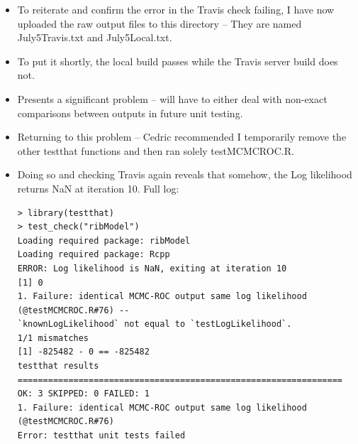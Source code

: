 \documentclass[12pt,hyperref]{labbook}
\begin{document}
\begin{itemize}
    \item To reiterate and confirm the error in the Travis check failing, I have now uploaded the raw output files to this directory -- They are named July5Travis.txt and July5Local.txt.
    \item To put it shortly, the local build passes while the Travis server build does not.
    \item Presents a significant problem -- will have to either deal with non-exact comparisons between outputs in future unit testing.
    \item Returning to this problem -- Cedric recommended I temporarily remove the other testthat functions and then ran solely testMCMCROC.R.
    \item Doing so and checking Travis again reveals that somehow, the Log likelihood returns NaN at iteration 10. Full log:

\noindent\begin{minipage}{\linewidth}
\begin{lstlisting}
> library(testthat)
> test_check("ribModel")
Loading required package: ribModel
Loading required package: Rcpp
ERROR: Log likelihood is NaN, exiting at iteration 10
[1] 0
1. Failure: identical MCMC-ROC output same log likelihood (@testMCMCROC.R#76) --
`knownLogLikelihood` not equal to `testLogLikelihood`.
1/1 mismatches
[1] -825482 - 0 == -825482
testthat results ================================================================
OK: 3 SKIPPED: 0 FAILED: 1
1. Failure: identical MCMC-ROC output same log likelihood (@testMCMCROC.R#76) 
Error: testthat unit tests failed
\end{lstlisting}
\end{minipage}
    

\end{itemize}
\end{document}

